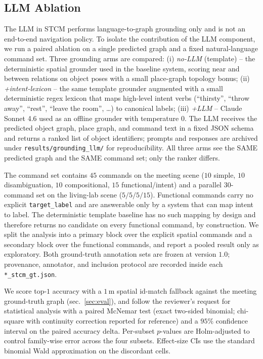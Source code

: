 \subsection{LLM Ablation}
\label{sec:llm_ablation}

The LLM in STCM performs language-to-graph grounding only and is not an
end-to-end navigation policy. To isolate the contribution of the LLM
component, we run a paired ablation on a single predicted graph and a
fixed natural-language command set. Three grounding arms are compared:
(i) \emph{no-LLM} (template) -- the deterministic spatial grounder used
in the baseline system, scoring near and between relations on object
poses with a small place-graph topology bonus;
(ii) \emph{+intent-lexicon} -- the same template grounder augmented with
a small deterministic regex lexicon that maps high-level intent verbs
(``thirsty'', ``throw away'', ``rest'', ``leave the room'', \dots) to
canonical labels;
(iii) \emph{+LLM} -- Claude Sonnet 4.6 used as an offline grounder
with temperature $0$. The LLM receives the predicted object graph,
place graph, and command text in a fixed JSON schema and returns a
ranked list of object identifiers; prompts and responses are archived
under \texttt{results/grounding\_llm/} for reproducibility. All three
arms see the SAME predicted graph and the SAME command set; only the
ranker differs.

The command set contains $45$ commands on the meeting scene
($10$ simple, $10$ disambiguation, $10$ compositional, $15$
functional/intent) and a parallel $30$-command set on the
living-lab scene ($5/5/5/15$). Functional commands carry no
explicit \texttt{target\_label} and are answerable only by a system
that can map intent to label. The deterministic template baseline
has no such mapping by design and therefore returns no candidate on
every functional command, by construction. We split the analysis
into a primary block over the explicit spatial commands and a
secondary block over the functional commands, and report a pooled
result only as exploratory. Both ground-truth annotation sets are
frozen at version $1.0$; provenance, annotator, and inclusion
protocol are recorded inside each \texttt{*\_stcm\_gt.json}.

We score top-$1$ accuracy with a $1\,\mathrm{m}$ spatial id-match
fallback against the meeting ground-truth graph (sec.~\ref{sec:eval}),
and follow the reviewer's request for statistical analysis with a
paired McNemar test (exact two-sided binomial; chi-square with
continuity correction reported for reference) and a $95\%$ confidence
interval on the paired accuracy delta. Per-subset $p$-values are
Holm-adjusted to control family-wise error across the four subsets.
Effect-size CIs use the standard binomial Wald approximation on the
discordant cells.

